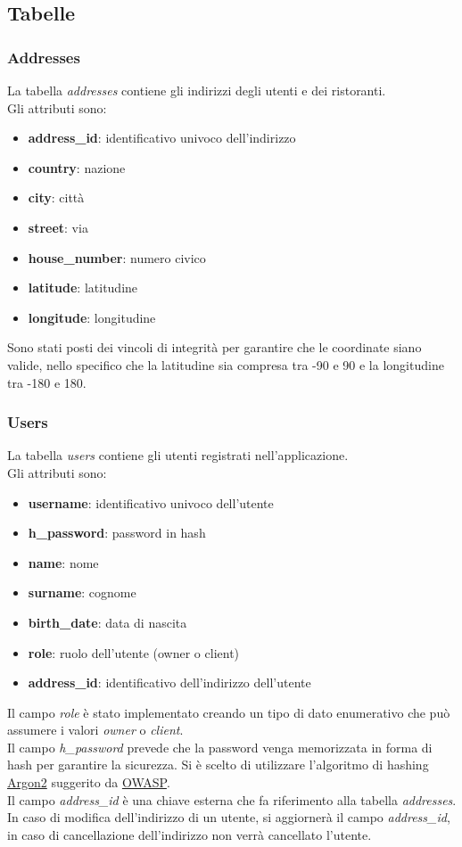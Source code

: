 \subsection{Tabelle}
\subsubsection{Addresses}
La tabella \textit{addresses} contiene gli indirizzi degli 
utenti e dei ristoranti.\\
Gli attributi sono:
\begin{itemize}
    \item \textbf{address\_id}: identificativo univoco dell'indirizzo
    \item \textbf{country}: nazione
    \item \textbf{city}: città
    \item \textbf{street}: via
    \item \textbf{house\_number}: numero civico
    \item \textbf{latitude}: latitudine
    \item \textbf{longitude}: longitudine
\end{itemize}
Sono stati posti dei vincoli di integrità per garantire che 
le coordinate siano valide, nello specifico che la latitudine
sia compresa tra -90 e 90 e la longitudine tra -180 e 180.

\subsubsection{Users}
La tabella \textit{users} contiene gli utenti registrati 
nell'applicazione.\\
Gli attributi sono:
\begin{itemize}
    \item \textbf{username}: identificativo univoco dell'utente
    \item \textbf{h\_password}: password in hash
    \item \textbf{name}: nome
    \item \textbf{surname}: cognome
    \item \textbf{birth\_date}: data di nascita
    \item \textbf{role}: ruolo dell'utente (owner o client)
    \item \textbf{address\_id}: identificativo dell'indirizzo dell'utente
\end{itemize}
Il campo \textit{role} è stato implementato creando un tipo di 
dato enumerativo che può assumere i valori \textit{owner} o \textit{client}.\\
Il campo \textit{h\_password} prevede che la password venga 
memorizzata in forma di hash per garantire la sicurezza.
Si è scelto di utilizzare l'algoritmo di hashing 
\href{https://github.com/p-h-c/phc-winner-argon2}{Argon2} suggerito 
da \href{https://cheatsheetseries.owasp.org/cheatsheets/Password_Storage_Cheat_Sheet.html}{OWASP}.\\
Il campo \textit{address\_id} è una chiave esterna che fa riferimento 
alla tabella \textit{addresses}. 
In caso di modifica dell'indirizzo
di un utente, si aggiornerà il campo \textit{address\_id}, in caso 
di cancellazione dell'indirizzo non verrà cancellato l'utente.

